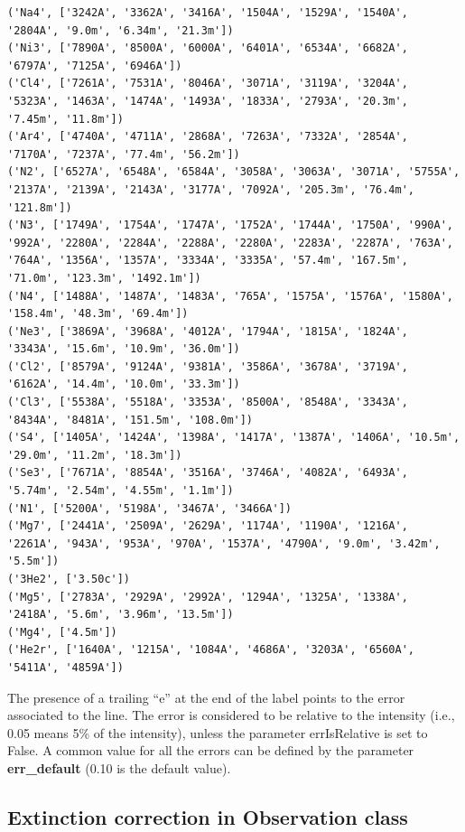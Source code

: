 \documentclass{report}
\begin{document}
\begin{Verbatim}[commandchars=\\\{\}]
('Na4', ['3242A', '3362A', '3416A', '1504A', '1529A', '1540A', '2804A', '9.0m', '6.34m', '21.3m'])
('Ni3', ['7890A', '8500A', '6000A', '6401A', '6534A', '6682A', '6797A', '7125A', '6946A'])
('Cl4', ['7261A', '7531A', '8046A', '3071A', '3119A', '3204A', '5323A', '1463A', '1474A', '1493A', '1833A', '2793A', '20.3m', '7.45m', '11.8m'])
('Ar4', ['4740A', '4711A', '2868A', '7263A', '7332A', '2854A', '7170A', '7237A', '77.4m', '56.2m'])
('N2', ['6527A', '6548A', '6584A', '3058A', '3063A', '3071A', '5755A', '2137A', '2139A', '2143A', '3177A', '7092A', '205.3m', '76.4m', '121.8m'])
('N3', ['1749A', '1754A', '1747A', '1752A', '1744A', '1750A', '990A', '992A', '2280A', '2284A', '2288A', '2280A', '2283A', '2287A', '763A', '764A', '1356A', '1357A', '3334A', '3335A', '57.4m', '167.5m', '71.0m', '123.3m', '1492.1m'])
('N4', ['1488A', '1487A', '1483A', '765A', '1575A', '1576A', '1580A', '158.4m', '48.3m', '69.4m'])
('Ne3', ['3869A', '3968A', '4012A', '1794A', '1815A', '1824A', '3343A', '15.6m', '10.9m', '36.0m'])
('Cl2', ['8579A', '9124A', '9381A', '3586A', '3678A', '3719A', '6162A', '14.4m', '10.0m', '33.3m'])
('Cl3', ['5538A', '5518A', '3353A', '8500A', '8548A', '3343A', '8434A', '8481A', '151.5m', '108.0m'])
('S4', ['1405A', '1424A', '1398A', '1417A', '1387A', '1406A', '10.5m', '29.0m', '11.2m', '18.3m'])
('Se3', ['7671A', '8854A', '3516A', '3746A', '4082A', '6493A', '5.74m', '2.54m', '4.55m', '1.1m'])
('N1', ['5200A', '5198A', '3467A', '3466A'])
('Mg7', ['2441A', '2509A', '2629A', '1174A', '1190A', '1216A', '2261A', '943A', '953A', '970A', '1537A', '4790A', '9.0m', '3.42m', '5.5m'])
('3He2', ['3.50c'])
('Mg5', ['2783A', '2929A', '2992A', '1294A', '1325A', '1338A', '2418A', '5.6m', '3.96m', '13.5m'])
('Mg4', ['4.5m'])
('He2r', ['1640A', '1215A', '1084A', '4686A', '3203A', '6560A', '5411A', '4859A'])

    \end{Verbatim}

The presence of a trailing ``e'' at the end of the label points to the
error associated to the line. The error is considered to be relative to
the intensity (i.e., 0.05 means 5\% of the intensity), unless the
parameter errIsRelative is set to False. A common value for all the
errors can be defined by the parameter \textbf{err\_default} (0.10 is
the default value).

\subsection{Extinction correction in Observation
class}\label{extinction-correction-in-observation-class}
\end{document}
